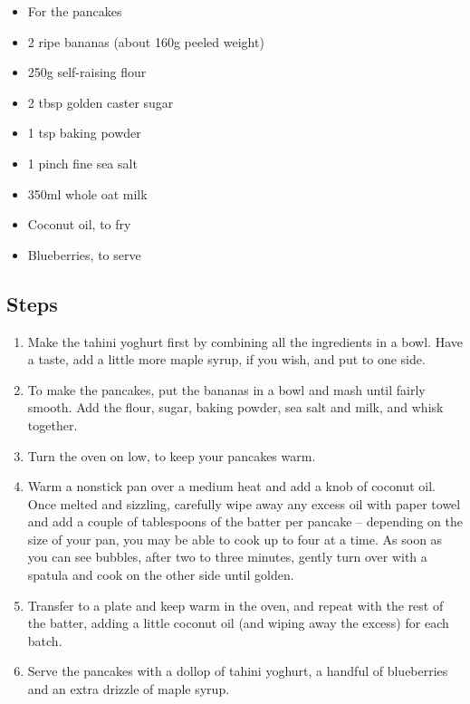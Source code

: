\documentclass{book}
\begin{document}
\begin{itemize}
\item For the pancakes
\item 2 ripe bananas (about 160g peeled weight)
\item 250g self-raising flour
\item 2 tbsp golden caster sugar
\item 1 tsp baking powder
\item 1 pinch fine sea salt
\item 350ml whole oat milk
\item Coconut oil, to fry
\item Blueberries, to serve
\end{itemize}

\subsection*{Steps}
\begin{enumerate}
\item Make the tahini yoghurt first by combining all the ingredients in a bowl. Have a taste, add a little more maple syrup, if you wish, and put to one side.
\item To make the pancakes, put the bananas in a bowl and mash until fairly smooth. Add the flour, sugar, baking powder, sea salt and milk, and whisk together.
\item Turn the oven on low, to keep your pancakes warm.
\item Warm a nonstick pan over a medium heat and add a knob of coconut oil. Once melted and sizzling, carefully wipe away any excess oil with paper towel and add a couple of tablespoons of the batter per pancake – depending on the size of your pan, you may be able to cook up to four at a time. As soon as you can see bubbles, after two to three minutes, gently turn over with a spatula and cook on the other side until golden.
\item Transfer to a plate and keep warm in the oven, and repeat with the rest of the batter, adding a little coconut oil (and wiping away the excess) for each batch.
\item Serve the pancakes with a dollop of tahini yoghurt, a handful of blueberries and an extra drizzle of maple syrup.
\end{enumerate}
\newpage
\end{document}
